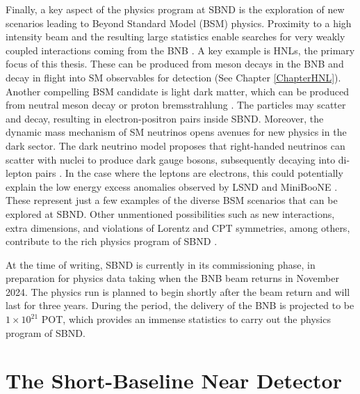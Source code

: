 Finally, a key aspect of the physics program at SBND is the exploration of new scenarios leading to Beyond Standard Model (BSM) physics. 
Proximity to a high intensity beam and the resulting large statistics enable searches for very weakly coupled interactions coming from the BNB \cite{SBNProgram}.
A key example is HNLs, the primary focus of this thesis.
These can be produced from meson decays in the BNB and decay in flight into SM observables for detection (See Chapter \ref{ChapterHNL}).
Another compelling BSM candidate is light dark matter, which can be produced from neutral meson decay or proton bremsstrahlung \cite{LightDarkMatter}. 
The particles may scatter and decay, resulting in electron-positron pairs inside SBND.
Moreover, the dynamic mass mechanism of SM neutrinos opens avenues for new physics in the dark sector. 
The dark neutrino model proposes that right-handed neutrinos can scatter with nuclei to produce dark gauge bosons, subsequently decaying into di-lepton pairs \cite{DarkNeutrino}. 
In the case where the leptons are electrons, this could potentially explain the low energy excess anomalies observed by LSND and MiniBooNE \cite{DarkNeutrinoLEE}.
These represent just a few examples of the diverse BSM scenarios that can be explored at SBND. 
Other unmentioned possibilities such as new interactions, extra dimensions, and violations of Lorentz and CPT symmetries, among others, contribute to the rich physics program of SBND \cite{SBNProgram}.

At the time of writing, SBND is currently in its commissioning phase, in preparation for physics data taking when the BNB beam returns in November 2024.
The physics run is planned to begin shortly after the beam return and will last for three years.
During the period, the delivery of the BNB is projected to be $1 \times 10^{21}$ POT, which provides an immense statistics to carry out the physics program of SBND.

\section{The Short-Baseline Near Detector}
\label{sec4SBND}

